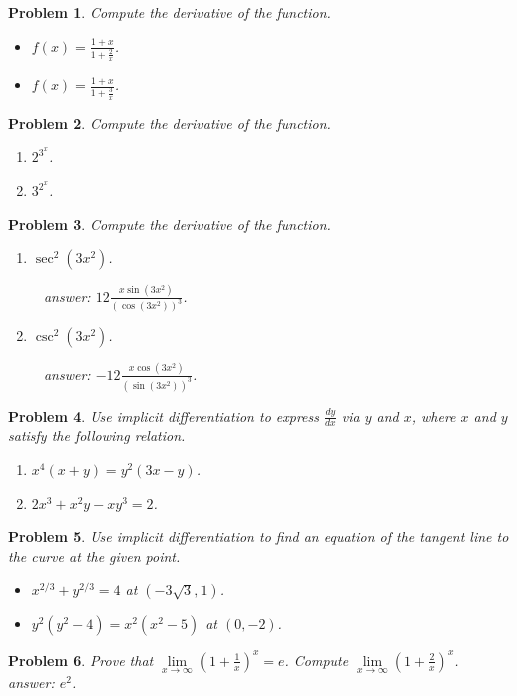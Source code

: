 \documentclass{article}
\newtheorem{problem}{Problem}
\begin{document}
\begin{problem}
Compute the derivative of the function.
\begin{itemize}
\item $f(x)=\frac{1+x }{1+\frac{2}x}$.
\hfill{~}  
\item $f(x)=\frac{1+x }{1+\frac{3}x}$.
\hfill{~}  
\end{itemize}
\end{problem}
\begin{problem}Compute the derivative of the function.
\begin{enumerate}
\item $2^{3^x}$.
\hfill{~}  
\item $3^{2^x}$.
\hfill{~}  
\end{enumerate}
\end{problem}
\begin{problem}Compute the derivative of the function.
\begin{enumerate}
\item $\sec^2 (3x^2)$.

\hfill{~}  
{
answer:
$
12 \frac{x\sin{}(3 x^{2}) }{(\cos{}(3 x^{2}))^{3}}
$.
}
\item $\csc^2 (3x^2)$.

\hfill{~}  
{
answer: $-12 \frac{ x  \cos{}(3 x^{2}) }{(\sin{}(3 x^{2}))^{3}}$.
}
\end{enumerate}
\end{problem}
\begin{problem}
Use implicit differentiation to express $\frac{dy}{dx}$ via $y $ and $x$, where $x$ and $y$ satisfy the following relation.
\begin{enumerate}
\item  $x^4(x+y)=y^2(3x-y)$.
\item $2x^3+x^2y-xy^3=2$.
\end{enumerate}
\end{problem}

\begin{problem}
Use implicit differentiation to find an equation of the tangent line to the curve at the given point.
\begin{itemize}
\item $x^{2/3}+y^{2/3}=4$ at $(-3\sqrt{3}, 1)$.
\item $y^2(y^2-4)= x^2(x^2-5) $ at $(0,-2)$.
\end{itemize}
\end{problem}
\begin{problem}
Prove that $\lim\limits_{x\to \infty} \left( 1+ \frac{1}x \right)^x=e$. Compute $\lim\limits_{x\to \infty} \left( 1+ \frac{2}{x} \right)^x$.
\hfill{~}  
{
answer:
$
e^2
$.
}
\end{problem}
\end{document}
